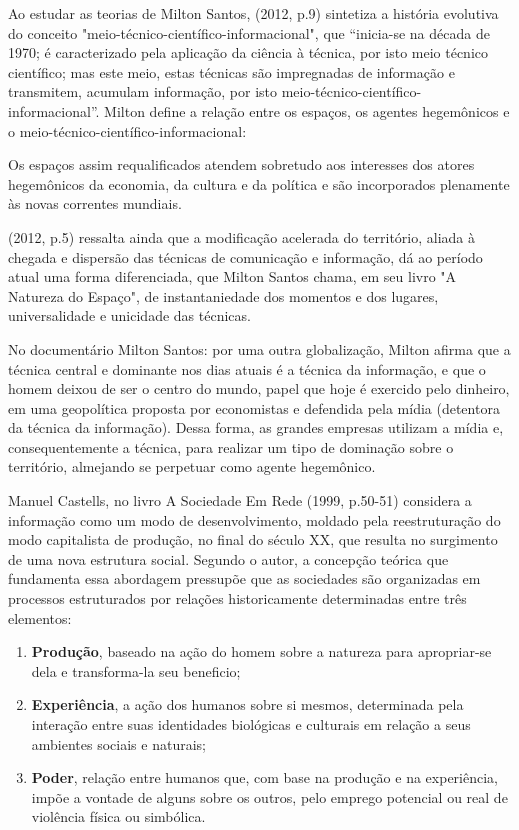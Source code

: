 Ao estudar as teorias de Milton Santos, \citeauthor{maia} (2012, p.9) sintetiza a história evolutiva do conceito "meio-técnico-científico-informacional", que “inicia-se na década de 1970; é caracterizado pela aplicação da ciência à técnica, por isto meio técnico científico; mas este meio, estas técnicas são impregnadas de informação e transmitem, acumulam informação, por isto meio-técnico-científico-informacional”. Milton define a relação entre os espaços, os agentes hegemônicos e o meio-técnico-científico-informacional:

\begin{citacao}
Os espaços assim requalificados atendem sobretudo aos interesses dos atores hegemônicos da economia, da cultura e da política e são incorporados plenamente às novas correntes mundiais. \cite[p. 191]{santos1996}
\end{citacao}

\citeauthor{maia} (2012, p.5) ressalta ainda que a modificação acelerada do território, aliada à chegada e dispersão das técnicas de comunicação e informação, dá ao período atual uma forma diferenciada, que Milton Santos chama, em seu livro "A Natureza do Espaço", de instantaniedade dos momentos e dos lugares, universalidade e unicidade das técnicas.

No documentário Milton Santos: por uma outra globalização, Milton afirma que a técnica central e dominante nos dias atuais é a técnica da informação, e que o homem deixou de ser o centro do mundo, papel que hoje é exercido pelo dinheiro, em uma geopolítica proposta por economistas e defendida pela mídia (detentora da técnica da informação). Dessa forma, as grandes empresas utilizam a mídia e, consequentemente a técnica, para realizar um tipo de dominação sobre o território, almejando se perpetuar como agente hegemônico.

Manuel Castells, no livro A Sociedade Em Rede (1999, p.50-51) considera a informação como um modo de desenvolvimento, moldado pela reestruturação do modo capitalista de produção, no final do século XX, que resulta no surgimento de uma nova estrutura social. Segundo o autor, a concepção teórica que fundamenta essa abordagem pressupõe que as sociedades são organizadas em processos estruturados por relações historicamente determinadas entre três elementos:

\begin{enumerate}

\item \textbf{Produção}, baseado na ação do homem sobre a natureza para apropriar-se dela e transforma-la seu beneficio;
\item \textbf{Experiência}, a ação dos humanos sobre si mesmos, determinada pela interação entre suas identidades biológicas e culturais em relação a seus ambientes sociais e naturais;
\item \textbf{Poder}, relação entre humanos que, com base na produção e na experiência, impõe a vontade de alguns sobre os outros, pelo emprego potencial ou real de violência física ou simbólica.

\end{enumerate}

